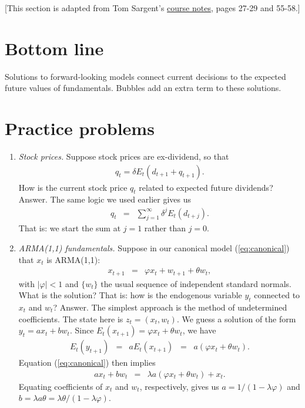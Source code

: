 \documentclass[11pt]{article}
\begin{document}
[This section is adapted from Tom Sargent's
\href{https://files.nyu.edu/ts43/public/teaching/NYU_course_all_2011.pdf}{course notes},
pages 27-29 and 55-58.]


\section*{Bottom line}

Solutions to forward-looking models connect current decisions
to the expected future values of fundamentals.
Bubbles add an extra term to these solutions.


\section*{Practice problems}

\begin{enumerate}
\item {\it Stock prices.\/}
Suppose stock prices are ex-dividend, so that
\begin{eqnarray*}
    q_t = \delta E_t (d_{t+1} + q_{t+1}) .
\end{eqnarray*}
How is the current stock price $q_t$ related to expected future
dividends?
%
Answer. The same logic we used earlier gives us
\begin{eqnarray*}
    q_t &=&  \sum_{j=1}^\infty \delta^j E_t (d_{t+j}) .
\end{eqnarray*}
That is:  we start the sum at $j=1$ rather than $j=0$.

\item {\it ARMA(1,1) fundamentals.\/}
Suppose in our canonical model (\ref{eq:canonical}) that
$x_t$ is ARMA(1,1):
\begin{eqnarray*}
    x_{t+1} &=& \varphi x_t + w_{t+1} + \theta w_t ,
\end{eqnarray*}
with $| \varphi| < 1$ and $\{ w_t \}$ the usual sequence of independent
standard normals.
What is the solution?
That is:  how is the endogenous variable $y_t$ connected to $x_t$ and $w_t$?
%
Answer.
The simplest approach is the method of undetermined coefficients.
The state here is $z_t = (x_t, w_t)$.
We guess a solution of the form
$ y_t = a x_t + b w_t $.
Since $ E_t (x_{t+1}) = \varphi x_t + \theta w_t $,
we have
\begin{eqnarray*}
    E_t (y_{t+1}) &=& a E_t (x_{t+1})
            \;\;=\;\; a (\varphi x_t + \theta w_t ).
\end{eqnarray*}
Equation (\ref{eq:canonical}) then implies
\begin{eqnarray*}
        a x_t + b w_t &=& \lambda a (\varphi x_t + \theta w_t ) + x_t .
\end{eqnarray*}
Equating coefficients of $x_t$ and $w_t$, respectively,
gives us $a = 1/(1-\lambda\varphi)$ and
$b = \lambda a \theta = \lambda \theta /(1-\lambda\varphi)$.



\end{enumerate}
\end{document}
